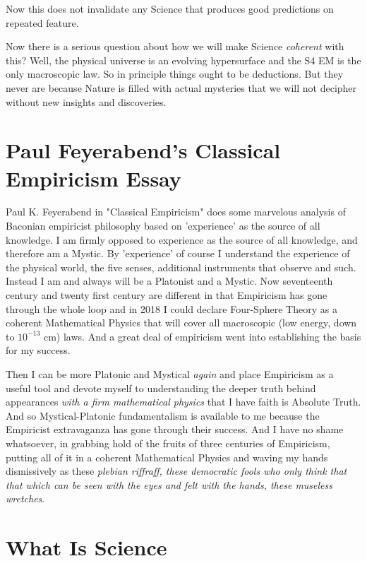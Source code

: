 \documentclass{amsart}
\begin{document}
Now this does not invalidate any Science that produces good predictions on repeated feature.

Now there is a serious question about how we will make Science {\em coherent} with this?  Well, the physical universe is an evolving hypersurface and the S4 EM is the only macroscopic law.  So in principle things ought to be deductions.  But they never are because Nature is filled with actual mysteries that we will not decipher without new insights and discoveries.  

\section{Paul Feyerabend's Classical Empiricism Essay}

Paul K. Feyerabend in "Classical Empiricism" does some marvelous analysis of Baconian empiricist philosophy based on 'experience' as the source of all knowledge.  I am firmly opposed to experience as the source of all knowledge, and therefore am a Mystic.  By 'experience' of course I understand the experience of the physical world, the five senses, additional instruments that observe and such.  Instead I am and always will be a Platonist and a Mystic.  Now seventeenth century and twenty first century are different in that Empiricism has gone through the whole loop and in 2018 I could declare Four-Sphere Theory as a coherent Mathematical Physics that will cover all macroscopic (low energy, down to $10^{-13}$ cm) laws.  And a great deal of empiricism went into establishing the basis for my success.

Then I can be more Platonic and Mystical {\em again} and place Empiricism as a useful tool and devote myself to understanding the deeper truth behind appearances {\em with a firm mathematical physics} that I have faith is Absolute Truth.  And so Mystical-Platonic fundamentalism is available to me because the Empiricist extravaganza has gone through their success.  And I have no shame whatsoever, in grabbing hold of the fruits of three centuries of Empiricism, putting all of it in a coherent Mathematical Physics and waving my hands dismissively as these {\em plebian riffraff, these democratic fools who only think that that which can be seen with the eyes and felt with the hands, these museless wretches}.  

\section{What Is Science}
\end{document}
